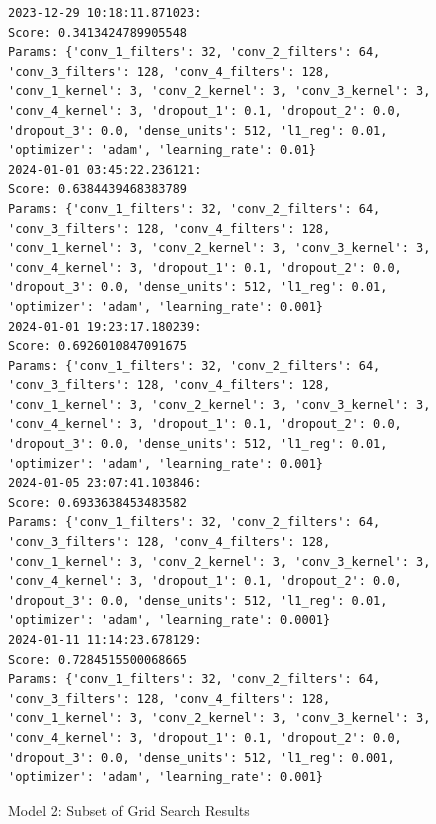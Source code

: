 \setcounter{figure}{0}
\setcounter{table}{0} 
\begin{figure}[H]
\begin{verbatim}
2023-12-29 10:18:11.871023:
Score: 0.3413424789905548
Params: {'conv_1_filters': 32, 'conv_2_filters': 64, 'conv_3_filters': 128, 'conv_4_filters': 128, 'conv_1_kernel': 3, 'conv_2_kernel': 3, 'conv_3_kernel': 3, 'conv_4_kernel': 3, 'dropout_1': 0.1, 'dropout_2': 0.0, 'dropout_3': 0.0, 'dense_units': 512, 'l1_reg': 0.01, 'optimizer': 'adam', 'learning_rate': 0.01}
2024-01-01 03:45:22.236121:
Score: 0.6384439468383789
Params: {'conv_1_filters': 32, 'conv_2_filters': 64, 'conv_3_filters': 128, 'conv_4_filters': 128, 'conv_1_kernel': 3, 'conv_2_kernel': 3, 'conv_3_kernel': 3, 'conv_4_kernel': 3, 'dropout_1': 0.1, 'dropout_2': 0.0, 'dropout_3': 0.0, 'dense_units': 512, 'l1_reg': 0.01, 'optimizer': 'adam', 'learning_rate': 0.001}
2024-01-01 19:23:17.180239:
Score: 0.6926010847091675
Params: {'conv_1_filters': 32, 'conv_2_filters': 64, 'conv_3_filters': 128, 'conv_4_filters': 128, 'conv_1_kernel': 3, 'conv_2_kernel': 3, 'conv_3_kernel': 3, 'conv_4_kernel': 3, 'dropout_1': 0.1, 'dropout_2': 0.0, 'dropout_3': 0.0, 'dense_units': 512, 'l1_reg': 0.01, 'optimizer': 'adam', 'learning_rate': 0.001}
2024-01-05 23:07:41.103846:
Score: 0.6933638453483582
Params: {'conv_1_filters': 32, 'conv_2_filters': 64, 'conv_3_filters': 128, 'conv_4_filters': 128, 'conv_1_kernel': 3, 'conv_2_kernel': 3, 'conv_3_kernel': 3, 'conv_4_kernel': 3, 'dropout_1': 0.1, 'dropout_2': 0.0, 'dropout_3': 0.0, 'dense_units': 512, 'l1_reg': 0.01, 'optimizer': 'adam', 'learning_rate': 0.0001}
2024-01-11 11:14:23.678129:
Score: 0.7284515500068665
Params: {'conv_1_filters': 32, 'conv_2_filters': 64, 'conv_3_filters': 128, 'conv_4_filters': 128, 'conv_1_kernel': 3, 'conv_2_kernel': 3, 'conv_3_kernel': 3, 'conv_4_kernel': 3, 'dropout_1': 0.1, 'dropout_2': 0.0, 'dropout_3': 0.0, 'dense_units': 512, 'l1_reg': 0.001, 'optimizer': 'adam', 'learning_rate': 0.001}
\end{verbatim}
\caption{Model 2: Subset of Grid Search Results}
\label{fig:model-2-grid-result}
\end{figure}

\newpage


